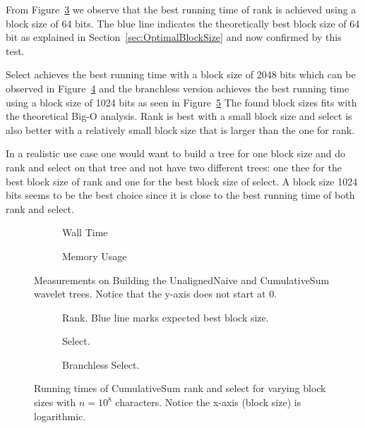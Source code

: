 From Figure~\ref{fig:CumulativeSumBlockSizeWallTimeRank} we observe that the best running time of rank is achieved using a block size of 64 bits.
The blue line indicates the theoretically best block size of 64 bit as explained in Section~\ref{sec:OptimalBlockSize} and now confirmed by this test.

Select achieves the best running time with a block size of 2048 bits which can be observed in Figure~\ref{fig:CumulativeSumBlockSizeWallTimeSelect} and the branchless version achieves the best running time using a block size of 1024 bits as seen in Figure~\ref{fig:CumulativeSumBlockSizeWallTimeSelectBranchless}
The found block sizes fits with the theoretical Big-O analysis.
Rank is best with a small block size and select is also better with a relatively small block size that is larger than the one for rank.

In a realistic use case one would want to build a tree for one block size and do rank and select on that tree and not have two different trees: one thee for the best block size of rank and one for the best block size of select.
A block size 1024 bits seems to be the best choice since it is close to the best running time of both rank and select.

\begin{figure}\tiny
\begin{subfigure}{0.48\textwidth}
	
	\caption{Wall Time}
	\label{fig:CumulativeSumBuildWalltime}
\end{subfigure}
\hfill
\begin{subfigure}{0.48\textwidth}
	
	\caption{Memory Usage}
	\label{fig:CumulativeSumBuildMemoryUsage}
\end{subfigure}
\caption{Measurements on Building the UnalignedNaive and CumulativeSum wavelet trees. Notice that the y-axis does not start at 0.}
\label{fig:CumulativeSumBuild}
\vspace{5mm}
\begin{subfigure}{0.48\textwidth}
	
	\caption{Rank. Blue line marks expected best block size.}
	\label{fig:CumulativeSumBlockSizeWallTimeRank}
\end{subfigure}
\hfill
\begin{subfigure}{0.48\textwidth}
	
	\caption{Select.}
	\label{fig:CumulativeSumBlockSizeWallTimeSelect}
\end{subfigure}

\begin{subfigure}{0.48\textwidth}
	
	\caption{Branchless Select.}
	\label{fig:CumulativeSumBlockSizeWallTimeSelectBranchless}
\end{subfigure}

\caption{Running times of CumulativeSum rank and select for varying block sizes with $n=10^8$ characters. Notice the x-axis (block size) is logarithmic.}
\label{fig:CumulativeSumBlockSize}
\end{figure}

